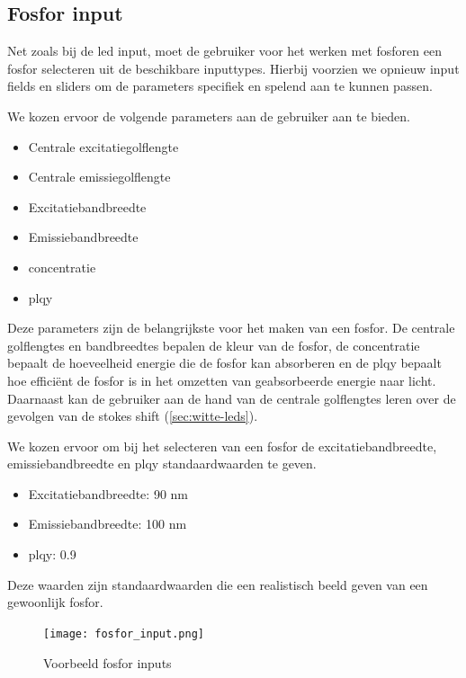 \subsection{Fosfor input}

Net zoals bij de \gls{led} input, moet de gebruiker voor het werken met fosforen een fosfor selecteren uit de beschikbare inputtypes. Hierbij voorzien we opnieuw input fields en sliders om de parameters specifiek en spelend aan te kunnen passen.

We kozen ervoor de volgende parameters aan de gebruiker aan te bieden.

\begin{itemize}
    \item Centrale excitatiegolflengte
    \item Centrale emissiegolflengte
    \item Excitatiebandbreedte
    \item Emissiebandbreedte
    \item concentratie
    \item \gls{plqy}
\end{itemize}

Deze parameters zijn de belangrijkste voor het maken van een fosfor. De centrale golflengtes en bandbreedtes bepalen de kleur van de fosfor, de concentratie bepaalt de hoeveelheid energie die de fosfor kan absorberen en de \gls{plqy} bepaalt hoe effici\"ent de fosfor is in het omzetten van geabsorbeerde energie naar licht. Daarnaast kan de gebruiker aan de hand van de centrale golflengtes leren over de gevolgen van de stokes shift (\cref{sec:witte-leds}).

We kozen ervoor om bij het selecteren van een fosfor de excitatiebandbreedte, emissiebandbreedte en \gls{plqy} standaardwaarden te geven.

\begin{itemize}
    \item Excitatiebandbreedte: 90 nm
    \item Emissiebandbreedte: 100 nm
    \item \gls{plqy}: 0.9
\end{itemize}

Deze waarden zijn standaardwaarden die een realistisch beeld geven van een gewoonlijk fosfor.

\begin{figure}[H]
    \centering
    \texttt{[image: fosfor\_input.png]}
    \caption{Voorbeeld fosfor inputs}%
    \label{fig:phos_input}
\end{figure}

